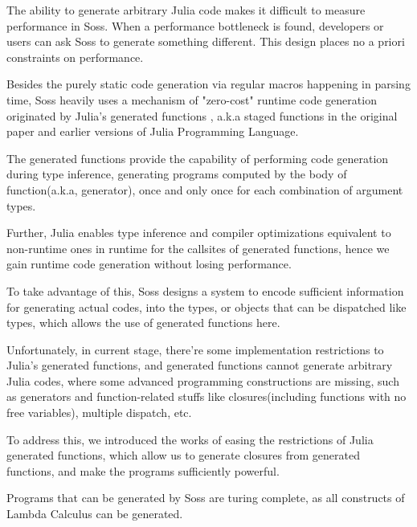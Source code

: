 \documentclass[anonymous=false, %
               format=acmsmall, %
               review=true, %
               screen=true, %
               nonacm=true]{acmart}
\begin{document}

The ability to generate arbitrary  Julia code makes it difficult to measure performance in Soss. When a performance bottleneck is found, developers or users can ask Soss to generate something different. This design places no a priori constraints on performance.


Besides the purely static code generation via regular macros happening in parsing time, Soss heavily uses a mechanism of "zero-cost" runtime code generation originated by Julia's generated functions \cite{bezanson2012julia}, a.k.a staged functions in the original paper and earlier versions of Julia Programming Language.

The generated functions provide the capability of performing code generation during type inference, generating programs computed by the body of function(a.k.a, generator), once and only once for each combination of argument types.

Further, Julia enables type inference and compiler optimizations equivalent to non-runtime ones in runtime for the callsites of generated functions, hence we gain runtime code generation without losing performance.

To take advantage of this, Soss designs a system to encode sufficient information for generating actual codes, into the types, or objects that can be dispatched like types, which allows the use of generated functions here.

Unfortunately, in current stage, there're some implementation restrictions to Julia's generated functions, and generated functions cannot generate arbitrary Julia codes,
where some advanced programming constructions are missing, such as generators and function-related stuffs like closures(including functions with no free variables), multiple dispatch, etc.

To address this, we introduced the works of easing the restrictions of Julia generated functions,
which allow us to generate closures from generated functions, and make the programs sufficiently powerful.

Programs that can be generated by Soss are turing complete, as all constructs of Lambda Calculus can be generated.

  
\end{document}
